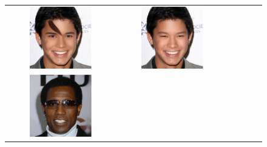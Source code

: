 \documentclass{article} %
\theoremstyle{definition}
\begin{document}
\begin{figure}[htp]
\begin{adjustbox}{max width=1.0\textwidth}
\begin{tabular}{cccccc}
\includegraphics[width=0.6\textwidth]{figures/celebahq/paintbrush_inpainting_flow_priors_batch2_im0_iterfinal_pnsr22.48.pdf} & 
\includegraphics[width=0.6\textwidth]{figures/celebahq/paintbrush_inpainting_pnp_flow_batch2_im0_iterfinal_pnsr29.40.pdf}  \\
\includegraphics[width=0.6\textwidth]{figures/celebahq/paintbrush_inpainting_clean_batch3_im0.pdf} & 

\end{tabular}
\end{adjustbox}
\end{figure}
\end{document}
